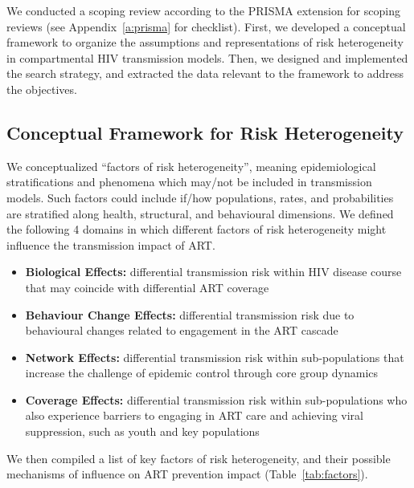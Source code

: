 We conducted a scoping review according to the PRISMA extension for scoping reviews
(see Appendix~\ref{a:prisma} for checklist).
First, we developed a conceptual framework to organize
the assumptions and representations of risk heterogeneity
in compartmental HIV transmission models.
Then, we designed and implemented the search strategy,
and extracted the data relevant to the framework
to address the objectives.
\subsection{Conceptual Framework for Risk Heterogeneity}
\label{ss:meth:framework}
We conceptualized ``factors of risk heterogeneity'', meaning
epidemiological stratifications and phenomena which may/not be included in transmission models.
Such factors could include if/how populations, rates, and probabilities
are stratified along health, structural, and behavioural dimensions.
We defined the following 4 domains in which
different factors of risk heterogeneity might influence the transmission impact of ART.
\begin{itemize}
  \item \textbf{Biological Effects:}
  differential transmission risk within HIV disease course
  that may coincide with differential ART coverage
  \cite{Pilcher2004}
  \item \textbf{Behaviour Change Effects:}
  differential transmission risk due to
  behavioural changes related to engagement in the ART cascade
  \cite{Ramachandran2016,Tiwari2020}
  \item \textbf{Network Effects:}
  differential transmission risk within sub-populations
  that increase the challenge of epidemic control through core group dynamics
  \cite{Anderson1986,Boily1997,Watts2010,Dodd2010}
  \item \textbf{Coverage Effects:}
  differential transmission risk within sub-populations
  who also experience barriers to engaging in ART care and achieving viral suppression,
  such as youth and key populations
  \cite{Mountain2014,Lancaster2016,Hakim2018,Green2020}
\end{itemize}
We then compiled a list of key factors of risk heterogeneity,
and their possible mechanisms of influence on ART prevention impact (Table~\ref{tab:factors}).
\begin{sidewaystable}
  \caption{%
    Factors of heterogeneity in HIV transmission
    and their possible mechanisms of influence on the prevention impact of ART interventions}
  
  \label{tab:factors}
\end{sidewaystable}
